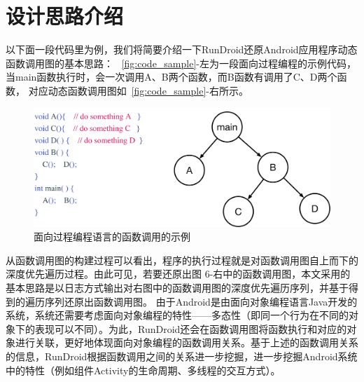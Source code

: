
\section{设计思路介绍}
以下面一段代码里为例，我们将简要介绍一下RunDroid还原Android应用程序动态函数调用图的基本思路：
~\autoref{fig:code_sample}-左为一段面向过程编程的示例代码，当main函数执行时，会一次调用A、B两个函数，而B函数有调用了C、D两个函数，
对应动态函数调用图如~\autoref{fig:code_sample}-右所示。
 
 
 \begin{figure}[h]
	\centering
	\includegraphics[width=\textwidth]{./Figures/code-sample.png}
	\caption{ 面向过程编程语言的函数调用的示例}
	\label{fig:code_sample}
\end{figure}


从函数调用图的构建过程可以看出，程序的执行过程就是对函数调用图自上而下的深度优先遍历过程。由此可见，若要还原出图 6-右中的函数调用图，本文采用的基本思路是以日志方式输出对右图中的函数调用图的深度优先遍历序列，并基于得到的遍历序列还原出函数调用图。
由于Android是由面向对象编程语言Java开发的系统，系统还需要考虑面向对象编程的特性——多态性（即同一个行为在不同的对象下的表现可以不同）。为此，RunDroid还会在函数调用图将函数执行和对应的对象进行关联，更好地体现面向对象编程的函数调用关系。基于上述的函数调用关系的信息，RunDroid根据函数调用之间的关系进一步挖掘，进一步挖掘Android系统中的特性（例如组件Activity的生命周期、多线程的交互方式）。

